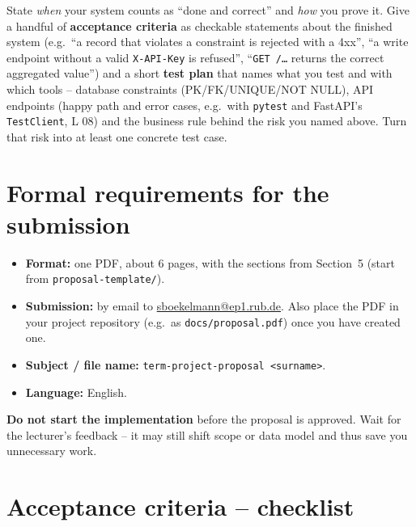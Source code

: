 \documentclass[11pt,a4paper]{article}
\begin{document}
State \emph{when} your system counts as ``done and correct'' and \emph{how} you
prove it. Give a handful of \textbf{acceptance criteria} as checkable statements
about the finished system (e.g.\ ``a record that violates a constraint is
rejected with a 4xx'', ``a write endpoint without a valid \texttt{X-API-Key} is
refused'', ``\texttt{GET /\dots} returns the correct aggregated value'') and a
short \textbf{test plan} that names what you test and with which tools --
database constraints (PK/FK/UNIQUE/NOT NULL), API endpoints (happy path and
error cases, e.g.\ with \texttt{pytest} and FastAPI's \texttt{TestClient}, L 08)
and the business rule behind the risk you named above. Turn that risk into at
least one concrete test case.

\section{Formal requirements for the submission}

\begin{itemize}[leftmargin=1.4em]
  \item \textbf{Format:} one PDF, about 6 pages, with the sections from
        Section~5 (start from \texttt{proposal-template/}).
  \item \textbf{Submission:} by email to
        \href{mailto:sboekelmann@ep1.rub.de}{sboekelmann@ep1.rub.de}. Also place
        the PDF in your project repository (e.g.\ as \texttt{docs/proposal.pdf})
        once you have created one.
  \item \textbf{Subject / file name:} \texttt{term-project-proposal
        <surname>}.
  \item \textbf{Language:} English.
\end{itemize}

\begin{warnbox}
\textbf{Do not start the implementation} before the proposal is approved. Wait
for the lecturer's feedback -- it may still shift scope or data model and thus
save you unnecessary work.
\end{warnbox}

\section{Acceptance criteria -- checklist}
\end{document}
